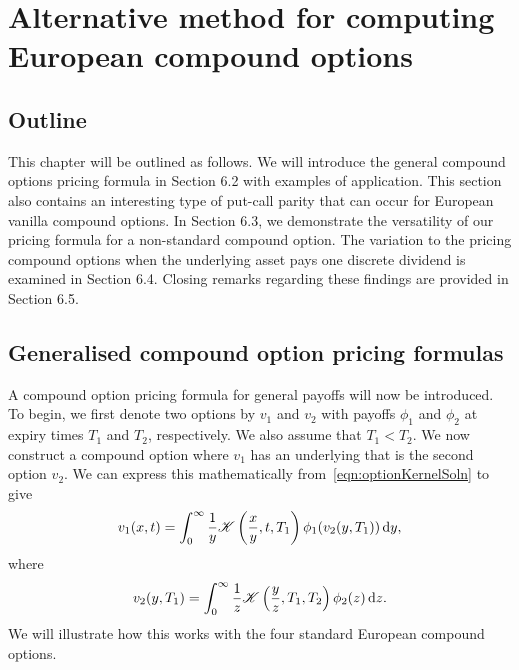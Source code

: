 \chapter[Alternative method for computing European compound options]{Alternative method for computing European compound options}

\section{Outline}
This chapter will be outlined as follows. We will introduce the general compound options pricing formula in Section 6.2 with examples of application. This section also contains an interesting type of put-call parity that can occur for European vanilla compound options. In Section 6.3, we demonstrate the versatility of our pricing formula for a non-standard compound option. The variation to the pricing compound options when the underlying asset pays one discrete dividend is examined in Section 6.4. Closing remarks regarding these findings are provided in Section 6.5.

\section{Generalised compound option pricing formulas}
\label{sec:gen}
A compound option pricing formula for general payoffs will now be introduced. To begin, we first denote two options by $v_1$ and $v_2$ with payoffs $\phi_1$ and $\phi_2$ at expiry times $T_1$ and $T_2$, respectively. We also assume that $T_1 < T_2$. We now construct a compound option where $v_1$ has an underlying that is the second option $v_2$. We can express this mathematically from~\eqref{eqn:optionKernelSoln} to give
	\begin{equation}
		\label{eqn:v1aa}
		v_1(x,t) = \int_0^\infty \frac{1}{y}\mathscr K\left( \frac{x}{y}, t, T_1 \right)\phi_1(v_2(y,T_1)) \, \mathrm d y,
	\end{equation}
where
	\begin{equation}
		\label{eqn:v2a}
		v_2(y,T_1) = \int_0^\infty \frac{1}{z}\mathscr K\left( \frac{y}{z}, T_1, T_2 \right)\phi_2(z)\, \mathrm d z.
	\end{equation}
We will illustrate how this works with the four standard European compound options.

